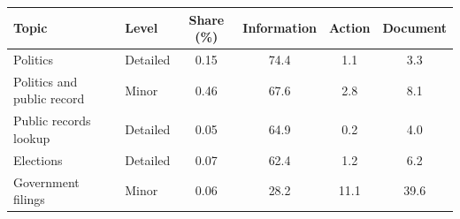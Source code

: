 \begin{tabular}{llcccc}
\toprule \toprule
Topic & Level & Share (\%) & Information & Action & Document \\
\midrule
Politics & Detailed & 0.15 & 74.4 & 1.1 & 3.3 \\
Politics and public record & Minor & 0.46 & 67.6 & 2.8 & 8.1 \\
Public records lookup & Detailed & 0.05 & 64.9 & 0.2 & 4.0 \\
Elections & Detailed & 0.07 & 62.4 & 1.2 & 6.2 \\
Government filings & Minor & 0.06 & 28.2 & 11.1 & 39.6 \\
\bottomrule \bottomrule
\end{tabular}
